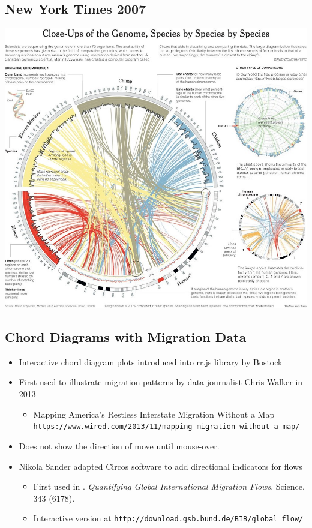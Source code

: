 \documentclass[
]{book}
\providecommand{\tightlist}{%
  \setlength{\itemsep}{0pt}\setlength{\parskip}{0pt}}
\begin{document}
\hypertarget{new-york-times-2007}{%
\subsection{New York Times 2007}\label{new-york-times-2007}}

\includegraphics[width=1\linewidth]{img/nyt}

\hypertarget{chord-diagrams-with-migration-data}{%
\subsection{Chord Diagrams with Migration Data}\label{chord-diagrams-with-migration-data}}

\begin{itemize}
\tightlist
\item
  Interactive chord diagram plots introduced into rr.js library by Bostock
\item
  First used to illustrate migration patterns by data journalist Chris Walker in 2013

  \begin{itemize}
  \tightlist
  \item
    Mapping America's Restless Interstate Migration Without a Map \texttt{https://www.wired.com/2013/11/mapping-migration-without-a-map/}
  \end{itemize}
\item
  Does not show the direction of move until mouse-over.
\item
  Nikola Sander adapted Circos software to add directional indicators for flows

  \begin{itemize}
  \tightlist
  \item
    First used in \citet{Abel2014}. \emph{Quantifying Global International Migration Flows}. Science, 343 (6178).
  \item
    Interactive version at \texttt{http://download.gsb.bund.de/BIB/global\_flow/}
  \end{itemize}
\end{itemize}
\end{document}

